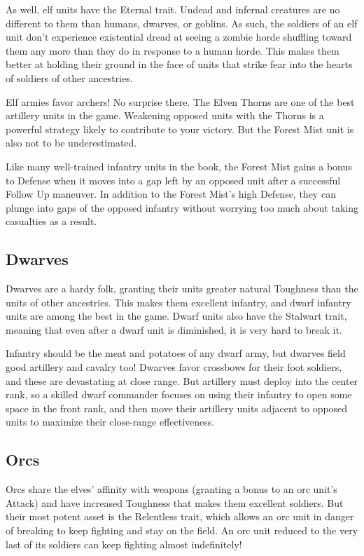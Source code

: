 \documentclass[10pt,a4paper,twoside,bg=print,twocolumn,openany,nodeprecatedcode]{dndbook}
\begin{document}
As well, elf units have the Eternal trait. Undead and infernal creatures are no different to them than humans, dwarves, or goblins. As such, the soldiers of an elf unit don't experience existential dread at seeing a zombie horde shuffling toward them any more than they do in response to a human horde. This makes them better at holding their ground in the face of units that strike fear into the hearts of soldiers of other ancestries.

Elf armies favor archers! No surprise there. The Elven Thorns are one of the best artillery units in the game. Weakening opposed units with the Thorns is a powerful strategy likely to contribute to your victory. But the Forest Mist unit is also not to be underestimated.

Like many well-trained infantry units in the book, the Forest Mist gains a bonus to Defense when it moves into a gap left by an opposed unit after a successful Follow Up maneuver. In addition to the Forest Mist's high Defense, they can plunge into gaps of the opposed infantry without worrying too much about taking casualties as a result.

\subsection{Dwarves}
Dwarves are a hardy folk, granting their units greater natural Toughness than the units of other ancestries. This makes them excellent infantry, and dwarf infantry units are among the best in the game. Dwarf units also have the Stalwart trait, meaning that even after a dwarf unit is diminished, it is very hard to break it.

Infantry should be the meat and potatoes of any dwarf army, but dwarves field good artillery and cavalry too! Dwarves favor crossbows for their foot soldiers, and these are devastating at close range. But artillery must deploy into the center rank, so a skilled dwarf commander focuses on using their infantry to open some space in the front rank, and then move their artillery units adjacent to opposed units to maximize their close-range effectiveness.

\subsection{Orcs}
Orcs share the elves' affinity with weapons (granting a bonus to an orc unit's Attack) and have increased Toughness that makes them excellent soldiers. But their most potent asset is the Relentless trait, which allows an orc unit in danger of breaking to keep fighting and stay on the field. An orc unit reduced to the very last of its soldiers can keep fighting almost indefinitely!
\end{document}
